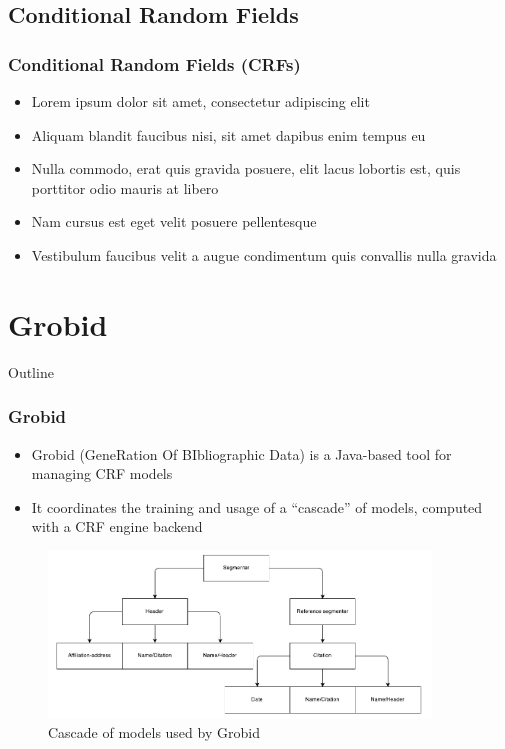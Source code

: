 \documentclass{beamer}
\begin{document}

\subsection{Conditional Random Fields}
\begin{frame}
\frametitle{Conditional Random Fields (CRFs)}
\begin{itemize}
\item Lorem ipsum dolor sit amet, consectetur adipiscing elit
\item Aliquam blandit faucibus nisi, sit amet dapibus enim tempus eu
\item Nulla commodo, erat quis gravida posuere, elit lacus lobortis est, quis porttitor odio mauris at libero
\item Nam cursus est eget velit posuere pellentesque
\item Vestibulum faucibus velit a augue condimentum quis convallis nulla gravida
\end{itemize}
\end{frame}


\section{Grobid}
\begin{frame}[noframenumbering]{Outline}
\tableofcontents[currentsection]
\end{frame}


\begin{frame}

\frametitle{Grobid}
\begin{itemize}
\item Grobid (GeneRation Of BIbliographic Data) is a Java-based tool for managing CRF models 
\item It coordinates the training and usage of a ``cascade'' of models, computed with a CRF engine backend
\end{itemize}

\begin{figure}[!ht]
\center
\includegraphics[width=4in]{figures/cascade.pdf}
\caption{Cascade of models used by Grobid}
\label{fig:cascade}
\end{figure}

\end{frame}
\end{document}
